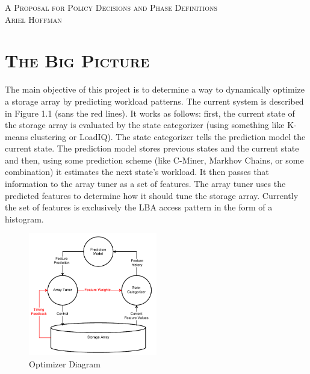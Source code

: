 \documentclass[11pt]{article}
\numberwithin{figure}{section}
\begin{document}
	\begin{center}
		\textsc{\Large{A Proposal for Policy Decisions and Phase Definitions \\}}
		\textsc{Ariel Hoffman \\}
		\hrulefill 
	\end{center}
	\section{\textsc{The Big Picture}}
		The main objective of this project is to determine a way to dynamically optimize a storage array by predicting workload patterns. The current system is described in Figure 1.1 (sans the red lines). It works as follows: first, the current state of the storage array is evaluated by the state categorizer (using something like K-means clustering or LoadIQ). The state categorizer tells the prediction model the current state. The prediction model stores previous states and the current state and then, using some prediction scheme (like C-Miner, Markhov Chains, or some combination) it estimates the next state's workload. It then passes that information to the array tuner as a set of features. The array tuner uses the predicted features to determine how it should tune the storage array. Currently the set of features is exclusively the LBA access pattern in the form of a histogram.\\
		
		\begin{figure}
			\caption{Optimizer Diagram}
			\centering
			\includegraphics[width=0.5\textwidth]{BigPicture.png}
		\end{figure}
		
\end{document}
